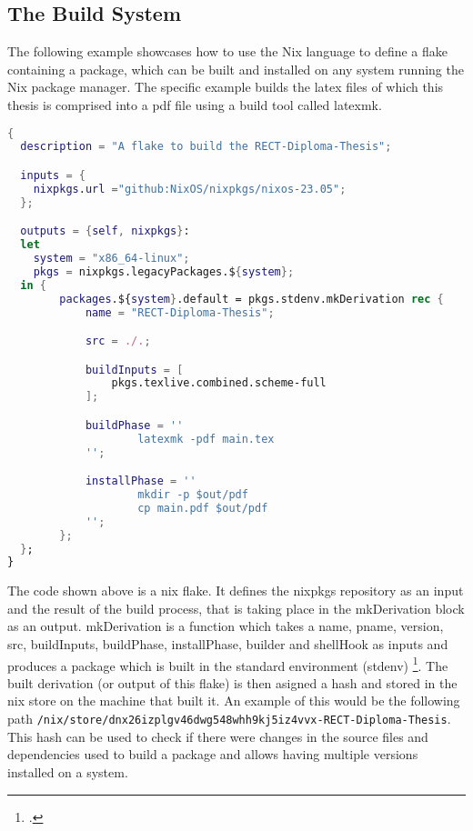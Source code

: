 \subsection{The Build System}
The following example showcases how to use the Nix language to define a flake containing a package, which can be built and installed on any system running the Nix package manager.
The specific example builds the latex files of which this thesis is comprised into a pdf file using a build tool called latexmk.
\medskip

\begin{minipage}{\textwidth}
\begin{lstlisting}[language=Nix, caption={The nix flake, that builds this diploma thesis}]
{
  description = "A flake to build the RECT-Diploma-Thesis";

  inputs = {
    nixpkgs.url ="github:NixOS/nixpkgs/nixos-23.05";
  };

  outputs = {self, nixpkgs}:
  let
    system = "x86_64-linux";
    pkgs = nixpkgs.legacyPackages.${system};
  in {
		packages.${system}.default = pkgs.stdenv.mkDerivation rec {
			name = "RECT-Diploma-Thesis";

			src = ./.;

			buildInputs = [
				pkgs.texlive.combined.scheme-full
			];

			buildPhase = ''
					latexmk -pdf main.tex
			'';

			installPhase = '' 
					mkdir -p $out/pdf
					cp main.pdf $out/pdf
			'';
		};
  };
}
\end{lstlisting}
\end{minipage}

The code shown above is a nix flake. It defines the nixpkgs repository as an input and the result of the build process,
that is taking place in the mkDerivation block as an output. mkDerivation is a function which takes a name, pname, version, src,
buildInputs, buildPhase, installPhase, builder and shellHook as inputs and produces a package which is built in the standard environment (stdenv) \footcite{nixMkDerivation}.
The built derivation (or output of this flake) is then asigned a hash and stored in the nix store on the machine that built it.
An example of this would be the following path \newline\verb+/nix/store/dnx26izplgv46dwg548whh9kj5iz4vvx-RECT-Diploma-Thesis+.
This hash can be used to check if there were changes in the source files and dependencies used to build a package and allows
having multiple versions installed on a system. 

